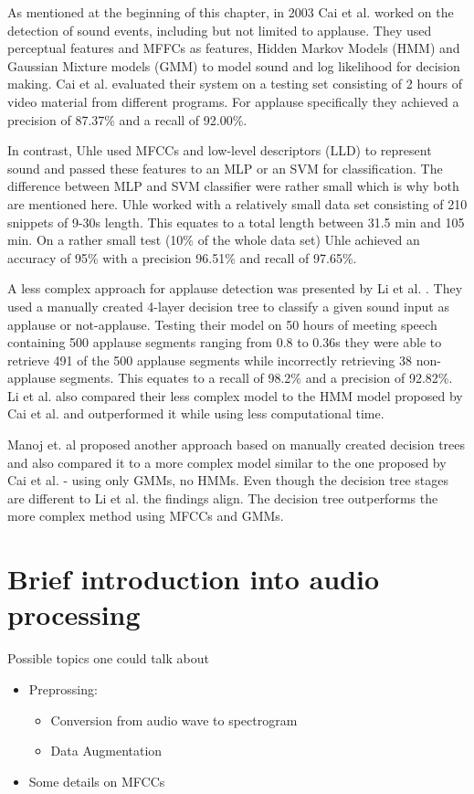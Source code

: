 \documentclass[bsc,frontabs,parskip,deptreport]{infthesis}
\begin{document}
As mentioned at the beginning of this chapter, in 2003 Cai et al. \cite{cai2003highlight} worked on the detection of sound events, including but not limited to applause.
They used perceptual features and MFFCs as features, Hidden Markov Models (HMM) and Gaussian Mixture models (GMM) to model sound and log likelihood for decision making.
Cai et al. evaluated their system on a testing set consisting of 2 hours of video material from different programs.
For applause specifically they achieved a precision of 87.37\% and a recall of 92.00\%.

In contrast, Uhle \cite{uhle2011applause} used MFCCs and low-level descriptors (LLD) to represent sound and passed these features to an MLP or an SVM for classification.
The difference between MLP and SVM classifier were rather small which is why both are mentioned here.
Uhle worked with a relatively small data set consisting of 210 snippets of 9-30s length. This equates to a total length between 31.5 min and 105 min.
On a rather small test (10\% of the whole data set) Uhle achieved an accuracy of 95\% with a precision 96.51\% and recall of 97.65\%.

A less complex approach for applause detection was presented by Li et al. \cite{li2009characteristics}.
They used a manually created 4-layer decision tree to classify a given sound input as applause or not-applause.
Testing their model on 50 hours of meeting speech containing 500 applause segments ranging from 0.8 to 0.36s they were able to retrieve 491 of the 500 applause segments while incorrectly retrieving 38 non-applause segments.
This equates to a recall of 98.2\% and a precision of 92.82\%. Li et al. also compared their less complex model to the HMM model proposed by Cai et al.\cite{cai2003highlight} and outperformed it while using less computational time.

Manoj et. al \cite{manoj2011novel} proposed another approach based on manually created decision trees and also compared it to a more complex model similar to the one proposed by Cai et al. \cite{cai2003highlight} - using only GMMs, no HMMs.
Even though the decision tree stages are different to Li et al. \cite{li2009characteristics} the findings align. The decision tree outperforms the more complex method using MFCCs and GMMs.  

\section{Brief introduction into audio processing} \label{theory}
Possible topics one could talk about
\begin{itemize}
    \item Preprossing: 
    \begin{itemize}
        \item Conversion from audio wave to spectrogram 
        \item Data Augmentation
    \end{itemize}
    \item Some details on MFCCs 
\end{itemize}
\end{document}
